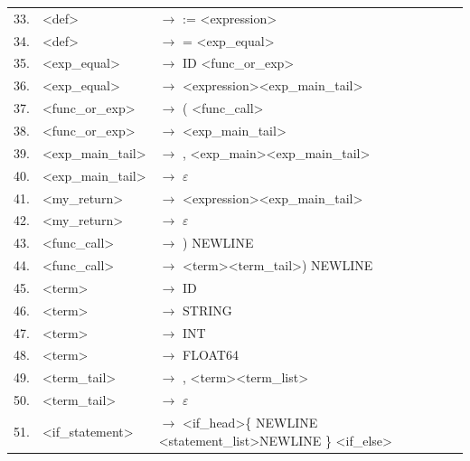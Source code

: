 \documentclass[a4paper,11pt]{article}
\begin{document}
\begin{table}[h!]
\begin{center}
\begin{scriptsize}
\begin{tabular}{lll}
    					33. &\textless def\textgreater  		   & $\rightarrow$ := \textless expression\textgreater \\
    					34. &\textless def\textgreater  		   & $\rightarrow$ = \textless exp\_equal\textgreater \\
    					35. &\textless exp\_equal\textgreater 	   & $\rightarrow$ ID \textless func\_or\_exp\textgreater \\
    					36. &\textless exp\_equal\textgreater  	   & $\rightarrow$ \textless expression\textgreater  \textless exp\_main\_tail\textgreater \\
    					37. &\textless func\_or\_exp\textgreater  	   & $\rightarrow$ ( \textless func\_call\textgreater \\
    					38. &\textless func\_or\_exp\textgreater  	   & $\rightarrow$ \textless exp\_main\_tail\textgreater \\
    					39. &\textless exp\_main\_tail\textgreater  & $\rightarrow$ , \textless exp\_main\textgreater  \textless exp\_main\_tail\textgreater \\
    					40. &\textless exp\_main\_tail\textgreater  & $\rightarrow$ $\varepsilon$\\
    					41. &\textless my\_return\textgreater  	   & $\rightarrow$ \textless expression\textgreater  \textless exp\_main\_tail\textgreater \\
    					42. &\textless my\_return\textgreater  	   & $\rightarrow$ $\varepsilon$\\
    					43. &\textless func\_call\textgreater  	   & $\rightarrow$ ) NEWLINE\\
    					44. &\textless func\_call\textgreater  	   & $\rightarrow$ \textless term\textgreater  \textless term\_tail\textgreater  ) NEWLINE\\
    					45. &\textless term\textgreater  	   & $\rightarrow$ ID\\
    					46. &\textless term\textgreater  	   & $\rightarrow$ STRING\\
    					47. &\textless term\textgreater  	   & $\rightarrow$ INT\\
    					48. &\textless term\textgreater  	   & $\rightarrow$ FLOAT64\\
   						49. &\textless term\_tail\textgreater  	   & $\rightarrow$ , \textless term\textgreater  \textless term\_list\textgreater \\
    					50. &\textless term\_tail\textgreater  	   & $\rightarrow$ $\varepsilon$\\
    					51. &\textless if\_statement\textgreater     & $\rightarrow$ \textless if\_head\textgreater  \{ NEWLINE \textless statement\_list\textgreater  NEWLINE \} \textless if\_else\textgreater \\

\end{tabular}
\end{scriptsize}
\end{center}
\end{table}
\end{document}
